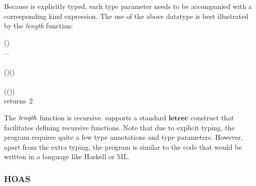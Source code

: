 Because \sufcc is explicitly typed, each type parameter
needs to be accompanied with a corresponding kind expression. The use
of the above datatype is best illustrated by the \emph{length}
function:
\begin{hscode}\SaveRestoreHook
{}%
%
%
%
%
\>[3]{}\;\mathbin{:}(\mathbin{:}\star)\to {}\;\to {}\mathrel{=}{}\<[E]%
\\
\>[3]{}\<[5]%
\>[5]{}\lambda {}\mathbin{:}\star.\,\lambda {}\mathbin{:}\;.\,\;\;\<[E]%
\\
\>[5]{}\<[8]%
\>[8]{}\Rightarrow {}\<[E]%
\\
\>[3]{}\<[5]%
\>[5]{}\mid {}\<[8]%
\>[8]{}\;(\mathbin{:})\;(\mathbin{:}\;)\Rightarrow {}\mathbin{+}\;\;\<[E]%
\\
\>[3]{}\<[E]%
\\
\>[3]{}\;\mathbin{:}\;\mathrel{=}\;\;\;(\;\;\;(\;)){}\<[E]%
\\
\>[3]{}\;\;\;\mbox{\onelinecomment  returns 2}{}\<[E]%
\ColumnHook
\end{hscode}\resethooks
The \ensuremath{\Varid{length}} function is recursive. \sufcc supports a standard
\ensuremath{\mathbf{letrec}} construct that facilitates defining recursive functions.
Note that due to explicit typing, the program requires quite a few
type annotations and type parameters. However, apart from the extra typing,
the program is similar to the code that would be written in a language
like Haskell or ML.

\subsubsection{HOAS}

